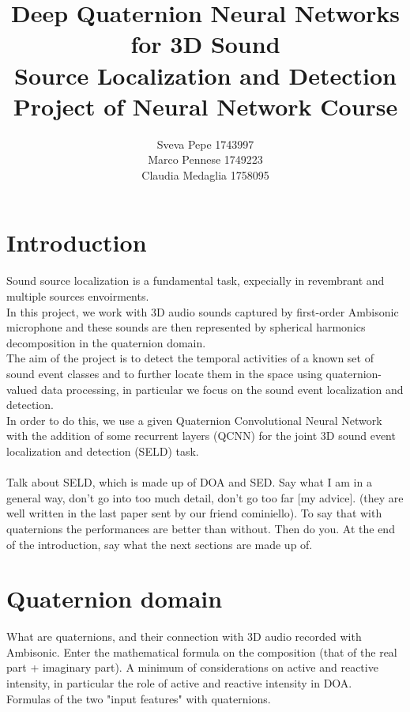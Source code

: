 \documentclass{article}
\title{Deep Quaternion Neural Networks for 3D Sound \\ Source Localization and Detection
\\ \large{\vspace{0.4cm}Project of Neural Network Course}}
\author{Sveva Pepe 1743997 \\  Marco Pennese 1749223 \\  Claudia Medaglia 1758095}
\date{}
\begin{document}
    \maketitle
    \section{Introduction}
    Sound source localization is a fundamental task, expecially in revembrant and multiple sources envoirments.\\
    In this project, we work with 3D audio sounds captured by first-order Ambisonic microphone and these sounds are then represented by spherical harmonics decomposition in the quaternion domain.\\
    The aim of the project is to detect the temporal activities of a known set of sound event classes and to further locate them in the space using quaternion-valued data processing, in particular we focus on the sound event localization and detection. \\ 
    In order to do this, we use a given Quaternion Convolutional Neural Network with the addition of some recurrent layers (QCNN) for the joint 3D sound event localization and detection (SELD) task.
    \\
    \\
    
  
     
        
    Talk about SELD, which is made up of DOA and SED. Say what I am in a general way, don't go into too much detail, don't go too 
    far [my advice]. (they are well written in the last paper sent by our friend cominiello).
    To say that with quaternions the performances are better than without.
    Then do you.
    At the end of the introduction, say what the next sections are made up of. 
    \section{Quaternion domain}
    What are quaternions, and their connection with 3D audio recorded with Ambisonic.
    Enter the mathematical formula on the composition (that of the real part + imaginary part).
    A minimum of considerations on active and reactive intensity, in particular
    the role of active and reactive intensity in DOA.
    \\ Formulas of the two "input features" with quaternions.
\end{document}

